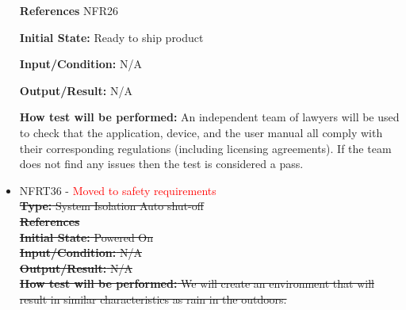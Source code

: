 \documentclass[12pt, titlepage]{article}
\begin{document}
\begin{itemize}
\textbf{References} NFR26
					
\textbf{Initial State:} Ready to ship product
					
\textbf{Input/Condition:} N/A
					
\textbf{Output/Result:} N/A
					
\textbf{How test will be performed:} An independent team of lawyers will be used to check that the application, device, and the user manual all comply with their corresponding regulations (including licensing agreements). If the team does not find any issues then the test is considered a pass.

\item{NFRT36 - \textcolor{red}{Moved to safety requirements}} 
\sout{\\
\textbf{Type:} System Isolation Auto shut-off\\

\textbf{References} \\
					
\textbf{Initial State:} Powered On\\
					
\textbf{Input/Condition:} N/A\\
					
\textbf{Output/Result:} N/A\\
					
\textbf{How test will be performed:} We will create an environment that will result in similar characteristics as rain in the outdoors.
}

\end{itemize}
\end{document}
